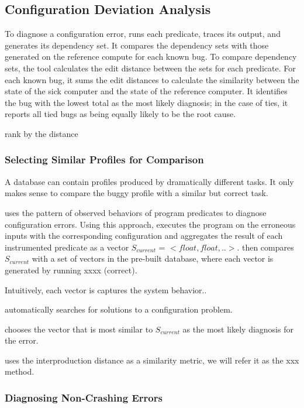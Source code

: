 \subsection{Configuration Deviation Analysis}
\label{sec:analysis}

To diagnose a configuration error, \ourtool runs each predicate, traces its
output, and generates its dependency set. It compares the dependency sets
with those generated on the reference compute for each known bug. To compare
dependency sets, the tool calculates the edit distance between the sets
for each predicate. For each known bug, it sums the edit
distances to calculate the similarity between the state of the sick
computer and the state of the reference computer. It identifies the bug
with the lowest total as the most likely diagnosis; in the case of ties,
it reports all tied bugs as being equally likely to be the root cause.

rank by the distance



\subsubsection{Selecting Similar Profiles for Comparison}

A database can contain profiles produced by dramatically
different tasks. It only makes sense to compare the buggy profile
with a similar but correct task.

\ourtool uses the pattern of observed behaviors of program predicates
to diagnose configuration errors. Using this approach, \ourtool
executes the program on the erroneous inputs with the
corresponding configuration and aggregates the result of
each instrumented predicate as a vector $S_{current}$ = $<float, float, ..>$.
\ourtool then compares $S_{current}$ with a set of
vectors in the pre-built database, where each vector is generated
by running xxxx (correct).

Intuitively, each vector is captures the system behavior..

\ourtool automatically searches for solutions to a configuration
problem.

\ourtool chooses the vector that is most similar to $S_{current}$ as
the most likely diagnosis for the error.

\ourtool uses the interproduction distance as a similarity metric, we will
refer it as the xxx method.


\subsubsection{Diagnosing Non-Crashing Errors}

